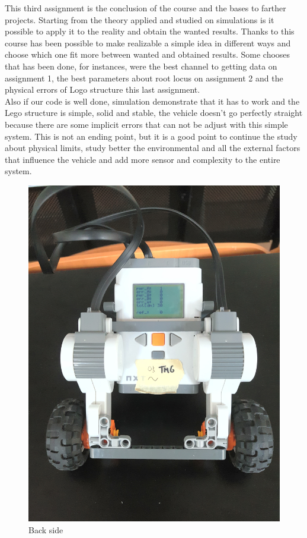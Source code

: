 \documentclass[a4paper,12pt,oneside]{article}
\begin{document}
This third assignment is the conclusion of the course and the bases to farther projects. Starting from the theory applied and studied on simulations is it possible to apply it to the reality and obtain the wanted results. Thanks to this course has been possible to make realizable a simple idea in different ways and choose which one fit more between wanted and obtained results. Some chooses that has been done, for instances, were the best channel to getting data on assignment 1, the best parameters about root locus on assignment 2 and the physical errors of Logo structure this last assignment.\\ Also if our code is well done, simulation demonstrate that it has to work and the Lego structure is simple, solid and stable, the vehicle doesn't go perfectly straight because there are some implicit errors that can not be adjust with this simple system. This is not an ending point, but it is a good point to continue the study about physical limits, study better the environmental and all the external factors that influence the vehicle and add more sensor and complexity to the entire system.
\begin{figure}
	\centering
	\includegraphics[width=\columnwidth]{nxtImages/1.jpg}
	\caption{Back side}
	\label{fig:back}
\end{figure}
\end{document}
